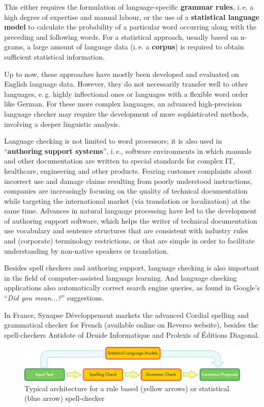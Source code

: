 \begin{multicols}{2}
This either requires the formulation of language-specific {\bf grammar
rules}, i.\,e. a high degree of expertise and manual labour, or the use
of a {\bf statistical language model} to calculate the probability of a
particular word occurring along with the preceding and following
words. For a statistical approach, usually based on n-grams, a large
amount of language data (i.\,e. a {\bf corpus}) is required to obtain
sufficient statistical information.  

Up to now, these approaches have mostly been developed and evaluated
on English language data. However, they do not necessarily transfer
well to other languages, e.\,g. highly inflectional ones or languages
with a flexible word order like German. For these more complex
languages, an advanced high-precision language checker may require the
development of more sophisticated methods, involving a deeper
linguistic analysis.

Language checking is not limited to word processors; it is also used
in ``{\bf authoring support systems}'', i.\,e., software environments in which
manuals and other documentation are written to special standards for
complex IT, healthcare, engineering and other products. Fearing
customer complaints about incorrect use and damage claims resulting
from poorly understood instructions, companies are increasingly
focusing on the quality of technical documentation while targeting the
international market (via translation or localization) at the same
time. Advances in natural language processing have led to the
development of authoring support software, which helps the writer of
technical documentation use vocabulary and sentence structures that
are consistent with industry rules and (corporate) terminology
restrictions, or that are simple in order to facilitate understanding
by non-native speakers or translation.

Besides spell checkers and authoring support, language checking is
also important in the field of computer-assisted language
learning. And language checking applications also automatically
correct search engine queries, as found in Google's ``{\em Did you mean...?}''
suggestions.

In France, Synapse Développement markets the advanced Cordial spelling
and grammatical checker for French (available online on Reverso
website), besides the spell-checkers Antidote of Druide Informatique
and Prolexis of Éditions Diagonal.

\begin{figure}[!ht]
\begin{center}
  \includegraphics[width=\textwidth]{../_media/english/language_checking}
\caption{Typical architecture for a rule based (yellow arrows) or statistical (blue arrow) spell-checker}
\label{fig:spellcheckerEn}
\end{center}
\end{figure}


\end{multicols}

